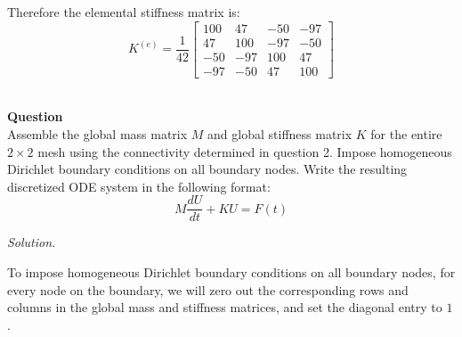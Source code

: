 \documentclass[12pt]{article}
\newcounter{question}
\newcounter{subquest}
\newcommand{\question}{
    \stepcounter{question} 
    \newpage
    \vspace{1.5em}
    \textbf{\\ \Large Question \thequestion \ }
    \vspace{.5em} 
    \setcounter{subquest}{0}\ \\}
\newcommand{\solution}
    {\par\vspace{0.5em}\noindent\emph{Solution.}\ }
    {\par\vspace{1em}}
\begin{document}
Therefore the elemental stiffness matrix is:
\[K^{(e)} = \frac{1}{42}
\begin{bmatrix}
100 & 47 & -50 & -97 \\
47 & 100 & -97 & -50 \\
-50 & -97 & 100 & 47 \\
-97 & -50 & 47 & 100
\end{bmatrix}\]

\question
Assemble the global mass matrix $M$ and global stiffness matrix $K$ for the entire $2 \times 2$ mesh using the connectivity determined in question 2. Impose homogeneous Dirichlet boundary conditions on all boundary nodes. Write the resulting discretized ODE system in the following format:
\[M \frac{dU}{dt} + KU = F(t)\]

\solution





To impose homogeneous Dirichlet boundary conditions on all boundary nodes, for every node on the boundary, we will zero out the corresponding rows and columns in the global mass and stiffness matrices, and set the diagonal entry to $1$. 
\end{document}
